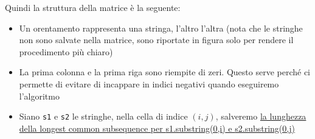 Quindi la struttura della matrice è la seguente:
\begin{itemize}
	\item Un orentamento rappresenta una stringa, l'altro l'altra (nota che le stringhe non sono salvate nella matrice, sono riportate in figura solo per rendere il procedimento più chiaro)
	\item La prima colonna e la prima riga sono riempite di zeri. Questo serve perché ci permette di evitare di incappare in indici negativi quando eseguiremo l'algoritmo
	\item Siano \verb|s1| e \verb|s2| le stringhe, nella cella di indice $ \left(i,j\right) $, salveremo \underline{la lunghezza della longest common subsequence per {\ttfamily s1.substring(0,i)} e {\ttfamily s2.substring(0,j)}}
\end{itemize}
\vskip3mm

